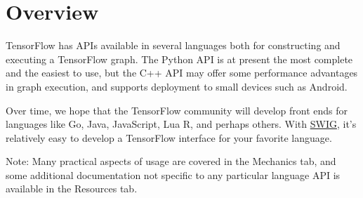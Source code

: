 

\section{Overview}\label{api_overview}

TensorFlow has APIs available in several languages both for constructing
and executing a TensorFlow graph. The Python API is at present the most
complete and the easiest to use, but the C++ API may offer some
performance advantages in graph execution, and supports deployment to
small devices such as Android.

Over time, we hope that the TensorFlow community will develop front ends
for languages like Go, Java, JavaScript, Lua R, and perhaps others. With
\href{http://swig.org}{SWIG}, it's relatively easy to develop a
TensorFlow interface for your favorite language.

Note: Many practical aspects of usage are covered in the Mechanics tab,
and some additional documentation not specific to any particular
language API is available in the Resources tab.